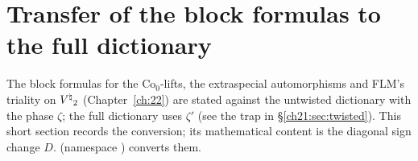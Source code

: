 \section{Transfer of the block formulas to the full dictionary}\label{ch21:sec:transfer}

The block formulas for the $\mathrm{Co}_0$-lifts, the extraspecial automorphisms and FLM's triality on
${V^{\natural}}_2$ (Chapter~\ref{ch:22}) are stated against the untwisted dictionary with the phase $\zeta$; the full
dictionary uses $\zeta'$ (see the trap in \S\ref{ch21:sec:twisted}).  This short section records the
conversion; its mathematical content is the diagonal sign change $D$.   (namespace
) converts them.

